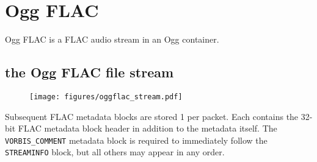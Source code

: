 
\chapter{Ogg FLAC}
Ogg FLAC is a FLAC audio stream in an Ogg container.

\section{the Ogg FLAC file stream}
\begin{figure}[h]
\texttt{[image: figures/oggflac\_stream.pdf]}
\end{figure}
\par
\noindent
Subsequent FLAC metadata blocks are stored 1 per packet.
Each contains the 32-bit FLAC metadata block header
in addition to the metadata itself.
The \texttt{VORBIS\_COMMENT} metadata block is required to immediately
follow the \texttt{STREAMINFO} block, but all others may appear in
any order.
